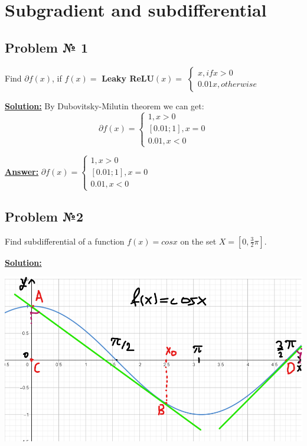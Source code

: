 \section{Subgradient and subdifferential}


\subsection{Problem № 1} 
Find $\partial f(x)$, if $f(x) = $ \textbf{Leaky ReLU}$(x) = $ $\begin{cases}
   x, if x > 0 \\
   0.01x , otherwise
 \end{cases}$
 
\underline{\textbf{Solution:}}
By Dubovitsky-Milutin theorem we can get:
\begin{equation*}
    \partial f(x) = \begin{cases}
        1, x > 0 \\
        [0.01; 1], x = 0 \\
        0.01, x < 0 
    \end{cases}
\end{equation*}

\underline{\textbf{Answer:}}
$
    \partial f(x) = \begin{cases}
        1, x > 0 \\
        [0.01; 1], x = 0 \\
        0.01, x < 0 
    \end{cases}
$
\subsection{Problem №2}
Find subdifferential of a function $f(x) = cosx$ on the set $X = [0, \frac{3}{2} \pi ]$.

\underline{\textbf{Solution:}}
\begin{center}
    \includegraphics[scale=0.7]{pictures/task_07_01.png}
\end{center}

